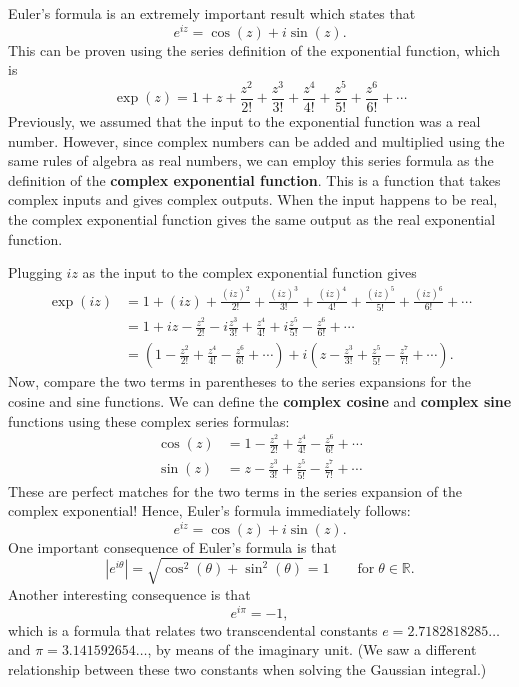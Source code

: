 \documentclass[10pt,a4paper]{article}
\begin{document}
Euler's formula is an extremely important result which states that
\begin{equation}
e^{iz} = \cos(z) + i \sin(z).
\end{equation}
This can be proven using the series definition of the exponential
function, which is
\begin{equation}
  \exp(z) = 1 + z + \frac{z^2}{2!} + \frac{z^3}{3!} + \frac{z^4}{4!} + \frac{z^5}{5!} + \frac{z^6}{6!} + \cdots
\end{equation}
Previously, we assumed that the input to the exponential function was
a real number. However, since complex numbers can be added and
multiplied using the same rules of algebra as real numbers, we can
employ this series formula as the definition of the \textbf{complex
  exponential function}. This is a function that takes complex inputs
and gives complex outputs. When the input happens to be real, the
complex exponential function gives the same output as the real
exponential function.

Plugging $iz$ as the input to the complex exponential function gives
\begin{align}
  \exp(iz) &= 1 + (iz) + \frac{(iz)^2}{2!} + \frac{(iz)^3}{3!} + \frac{(iz)^4}{4!} + \frac{(iz)^5}{5!} + \frac{(iz)^6}{6!} + \cdots \\&= 1 + iz - \frac{z^2}{2!} - i \frac{z^3}{3!} + \frac{z^4}{4!} + i \frac{z^5}{5!} - \frac{z^6}{6!} + \cdots \\& = \left(1 - \frac{z^2}{2!} + \frac{z^4}{4!} - \frac{z^6}{6!} + \cdots\right) + i\left(z  - \frac{z^3}{3!}  + \frac{z^5}{5!}  - \frac{z^7}{7!} + \cdots\right).
\end{align}
Now, compare the two terms in parentheses to the series expansions for
the cosine and sine functions. We can define the \textbf{complex
  cosine} and \textbf{complex sine} functions using these complex
series formulas:
\begin{align}
  \cos(z) &= 1 - \frac{z^2}{2!} + \frac{z^4}{4!} - \frac{z^6}{6!} + \cdots \\
  \sin(z) &= z - \frac{z^3}{3!} + \frac{z^5}{5!} - \frac{z^7}{7!} + \cdots
\end{align}
These are perfect matches for the two terms in the series expansion of
the complex exponential! Hence, Euler's formula immediately follows:
\begin{equation}
  e^{iz} = \cos(z) + i \sin(z).
\end{equation}
One important consequence of Euler's formula is that
\begin{equation}
  \left|e^{i\theta}\right| = \sqrt{\cos^2(\theta) + \sin^2(\theta)}
  = 1 \qquad \mathrm{for}\; \theta \in \mathbb{R}.
\end{equation}
Another interesting consequence is that
\begin{equation}
  e^{i\pi} = -1,
\end{equation}
which is a formula that relates two transcendental constants $e =
2.7182818285\dots$ and $\pi = 3.141592654\dots$, by means of the
imaginary unit. (We saw a different relationship between these two
constants when solving the Gaussian integral.)
\end{document}
